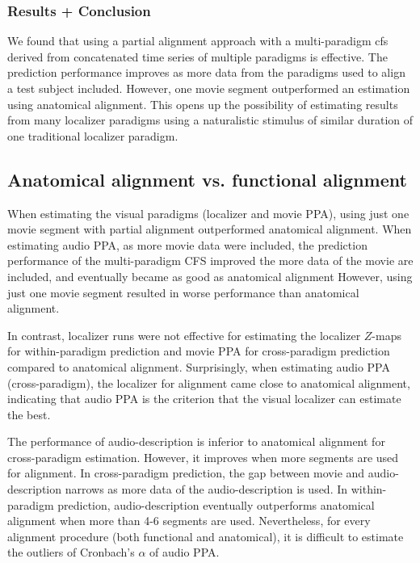 \subsubsection{Results + Conclusion}
%
We found that using a partial alignment approach with a multi-paradigm \ac{cfs}
derived from concatenated time series of multiple paradigms is effective.
%
The prediction performance improves as more data from the paradigms used to
align a test subject included.
%
However, one movie segment outperformed an estimation using anatomical
alignment.
%
This opens up the possibility of estimating results from many localizer
paradigms using a naturalistic stimulus of similar duration of one traditional
localizer paradigm.



\subsection{Anatomical alignment vs. functional alignment}



%
When estimating the visual paradigms (localizer and movie PPA), using just one
movie segment with partial alignment outperformed anatomical alignment.
%
When estimating audio PPA, as more movie data were included, the prediction
performance of the multi-paradigm CFS improved the more data of the movie are
included, and eventually became as good as anatomical alignment
%
However, using just one movie segment resulted in worse performance than
anatomical alignment.

%
In contrast, localizer runs were not effective for estimating the localizer
$Z$-maps for within-paradigm prediction and movie PPA for cross-paradigm
prediction compared to anatomical alignment.
%
Surprisingly, when estimating audio PPA (cross-paradigm), the localizer for
alignment came close to anatomical alignment, indicating that audio PPA is the
criterion that the visual localizer can estimate the best.


The performance of audio-description is inferior to anatomical alignment for
cross-paradigm estimation.
%
However, it improves when more segments are used for alignment.
%
In cross-paradigm prediction, the gap between movie and audio-description
narrows as more data of the audio-description is used.
%
In within-paradigm prediction, audio-description eventually outperforms
anatomical alignment when more than 4-6 segments are used.
%
Nevertheless, for every alignment procedure (both functional and anatomical), it
is difficult to estimate the outliers of Cronbach's $\alpha$ of audio PPA.



